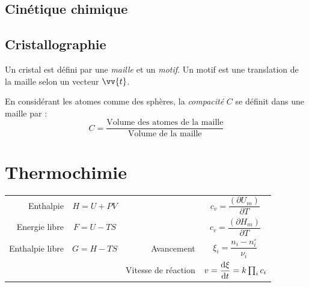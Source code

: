 \documentclass[11pt,a4paper,fleqn,pdftex]{report}
\begin{document}
\section{Cinétique chimique} %
\label{sec:cinetique_chimique}
\section{Cristallographie} %
\label{sec:cristallographie}
\begin{dfn}[Cristal]
   Un cristal est défini par une \emph{maille} et un \emph{motif}. Un motif est une translation de la maille selon un vecteur $\vv{t}$.
\end{dfn}
\begin{dfn}[Compacité]
   En considérant les atomes comme des sphères, la \emph{compacité} $C$ se définit dans une maille par :
   \begin{equation}
    C = \dfrac{\text{Volume des atomes de la maille}}{\text{Volume de la maille}}
   \end{equation}
\end{dfn}
\chapter{Thermochimie}
%
\begin{methode}
  \begin{tabular}{r c | r c}
    Enthalpie       & $H = U + PV$  
      & \parbox[c]{5cm}{}  & $c_v = \dfrac{\left( \partial U_m \right)}{\partial T}$ \\[10pt]
    Energie libre   & $F = U - TS$  
      & \parbox[c]{5cm}{} & $c_v = \dfrac{\left( \partial H_m \right)}{\partial T}$\\[10pt]
    Enthalpie libre & $G = H - TS$  & Avancement  & $\xi_i = \dfrac{n_i - n_i^\circ}{\nu_i}$ \\[10pt]
    & & Vitesse de réaction & $v = \dfrac{\mathrm{d} \xi}{\mathrm{d} t} = k\prod_i c_i$
  \end{tabular}
\end{methode}
\end{document}
